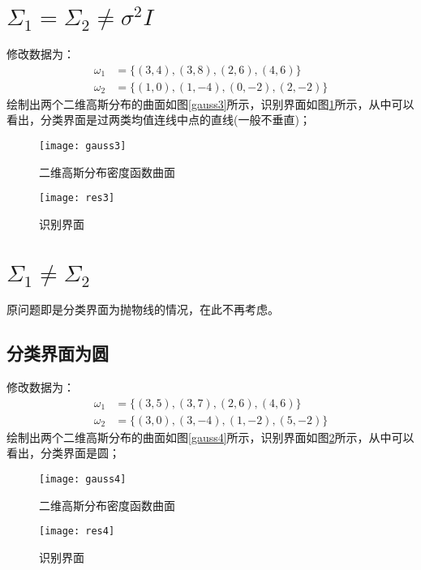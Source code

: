 \documentclass[cn]{elegantbook}
\begin{document}
\section{$\Sigma_1=\Sigma_2\ne\sigma^2I$}
修改数据为：
\begin{equation}
\begin{aligned}
\omega_1&=\{(3,4),(3,8),(2,6),(4,6)\} \\
\omega_2&=\{(1,0),(1,-4),(0,-2),(2,-2)\}
\end{aligned}
\end{equation}
绘制出两个二维高斯分布的曲面如图\ref{gauss3}所示，识别界面如图\ref{res3}所示，从中可以看出，分类界面是过两类均值连线中点的直线(一般不垂直)；
\begin{figure}[!h]
	\centering
	\begin{minipage}{0.48\linewidth}
		\centering
		\texttt{[image: gauss3]}
		\caption{\label{gauss3}二维高斯分布密度函数曲面}
	\end{minipage}
	\begin{minipage}{0.48\linewidth}
		\centering
		\texttt{[image: res3]}
		\caption{\label{res3}识别界面}
	\end{minipage}
\end{figure}

\section{$\Sigma_1\ne\Sigma_2$}
原问题即是分类界面为抛物线的情况，在此不再考虑。
\subsection{分类界面为圆}
修改数据为：
\begin{equation}
\begin{aligned}
\omega_1&=\{(3,5),(3,7),(2,6),(4,6)\} \\
\omega_2&=\{(3,0),(3,-4),(1,-2),(5,-2)\}
\end{aligned}
\end{equation}
绘制出两个二维高斯分布的曲面如图\ref{gauss4}所示，识别界面如图\ref{res4}所示，从中可以看出，分类界面是圆；
\begin{figure}[!h]
	\centering
	\begin{minipage}{0.48\linewidth}
		\centering
		\texttt{[image: gauss4]}
		\caption{\label{gauss4}二维高斯分布密度函数曲面}
	\end{minipage}
	\begin{minipage}{0.48\linewidth}
		\centering
		\texttt{[image: res4]}
		\caption{\label{res4}识别界面}
	\end{minipage}
\end{figure}
\end{document}
